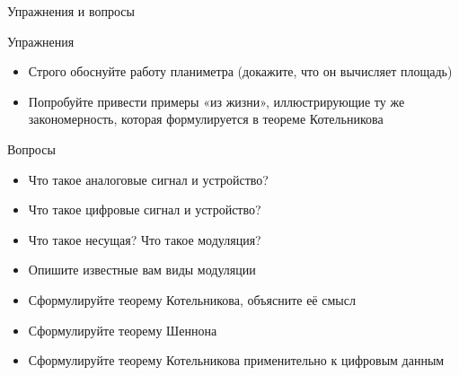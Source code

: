 \documentclass[xetex,aspectratio=43]{beamer}
\begin{document}
\begin{frame}{Упражнения и вопросы}
	\begin{block}{Упражнения}
		\begin{itemize}

			\item
			Строго обоснуйте работу планиметра (докажите, что он вычисляет
			площадь)
			\item
			Попробуйте привести примеры «из жизни», иллюстрирующие ту же
			закономерность, которая формулируется в теореме Котельникова
		\end{itemize}
	\end{block}

	\begin{block}{Вопросы}
		\begin{itemize}

			\item
			Что такое аналоговые сигнал и устройство?
			\item
			Что такое цифровые сигнал и устройство?
			\item
			Что такое несущая? Что такое модуляция?
			\item
			Опишите известные вам виды модуляции
			\item
			Сформулируйте теорему Котельникова, объясните её смысл
			\item
			Сформулируйте теорему Шеннона
			\item
			Сформулируйте теорему Котельникова применительно к цифровым данным
		\end{itemize}
	\end{block}
\end{frame}

\postamble
\end{document}
